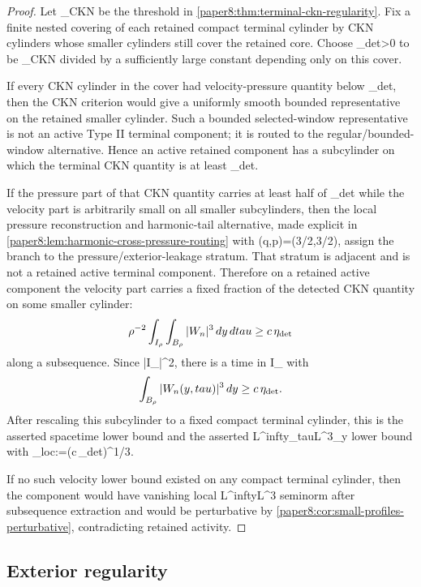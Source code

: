 \documentclass[11pt]{amsart}
\def\({}%
\def\){}%
\def\tau{tau}%
\def\infty{infty}%
\theoremstyle{plain}
\theoremstyle{definition}
\theoremstyle{remark}
\begin{document}
\begin{proof}
Let \(\varepsilon_{\rm CKN}\) be the threshold in
\cref{paper8:thm:terminal-ckn-regularity}.  Fix a finite nested covering of
each retained compact terminal cylinder by CKN cylinders whose smaller
cylinders still cover the retained core.  Choose
\(\eta_{\rm det}>0\) to be \(\varepsilon_{\rm CKN}\) divided by a sufficiently
large constant depending only on this cover.

If every CKN cylinder in the cover had velocity-pressure quantity below
\(\eta_{\rm det}\), then the CKN criterion would give a uniformly smooth
bounded representative on the retained smaller cylinder.  Such a bounded
selected-window representative is not an active Type II terminal component; it
is routed to the regular/bounded-window alternative.  Hence an active retained
component has a subcylinder on which the terminal CKN quantity is at least
\(\eta_{\rm det}\).

If the pressure part of that CKN quantity carries at least half of
\(\eta_{\rm det}\) while the velocity part is arbitrarily small on all smaller
subcylinders, then the local pressure reconstruction and harmonic-tail
alternative, made explicit in
\cref{paper8:lem:harmonic-cross-pressure-routing} with \((q,p)=(3/2,3/2)\), assign the branch to the
pressure/exterior-leakage stratum.  That stratum is adjacent and is not a
retained active terminal component.  Therefore on a retained active component
the velocity part carries a fixed fraction of the detected CKN quantity on some
smaller cylinder:
\[
  \rho^{-2}\int_{I_\rho}\int_{B_\rho}|W_n|^3\,dy\,d\tau
  \ge c\,\eta_{\rm det}
\]
along a subsequence.  Since \(|I_\rho|\simeq\rho^2\), there is a time in
\(I_\rho\) with
\[
  \int_{B_\rho}|W_n(y,\tau)|^3\,dy\ge c\,\eta_{\rm det}.
\]
After rescaling this subcylinder to a fixed compact terminal cylinder, this is
the asserted spacetime lower bound and the asserted
\(L^\infty_\tau L^3_y\) lower bound with
\(\varepsilon_{\rm loc}:=(c\,\eta_{\rm det})^{1/3}\).

If no such velocity lower bound existed on any compact terminal cylinder, then
the component would have vanishing local \(L^\infty L^3\) seminorm after
subsequence extraction and would be perturbative by
\cref{paper8:cor:small-profiles-perturbative}, contradicting retained
activity.
\end{proof}

\subsection{Exterior regularity}
\end{document}
